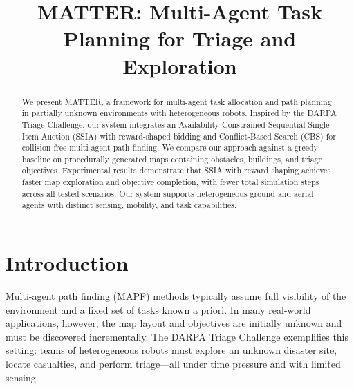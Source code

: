 \documentclass[conference]{IEEEtran}
\begin{document}
\title{MATTER: Multi-Agent Task Planning for Triage and Exploration}

\author{
\and
{}
\and
{}
}

\maketitle

\begin{abstract}
We present MATTER, a framework for multi-agent task allocation and path planning in partially unknown environments with heterogeneous robots. Inspired by the DARPA Triage Challenge, our system integrates an Availability-Constrained Sequential Single-Item Auction (SSIA) with reward-shaped bidding and Conflict-Based Search (CBS) for collision-free multi-agent path finding. We compare our approach against a greedy baseline on procedurally generated maps containing obstacles, buildings, and triage objectives. Experimental results demonstrate that SSIA with reward shaping achieves faster map exploration and objective completion, with fewer total simulation steps across all tested scenarios. Our system supports heterogeneous ground and aerial agents with distinct sensing, mobility, and task capabilities.
\end{abstract}

\section{Introduction}

Multi-agent path finding (MAPF) methods typically assume full visibility of the environment and a fixed set of tasks known a priori. In many real-world applications, however, the map layout and objectives are initially unknown and must be discovered incrementally. The DARPA Triage Challenge exemplifies this setting: teams of heterogeneous robots must explore an unknown disaster site, locate casualties, and perform triage---all under time pressure and with limited sensing.
\end{document}
